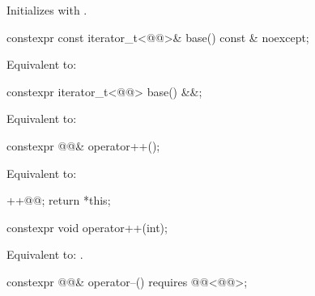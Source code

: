 \begin{itemdescr}
\pnum
\effects
Initializes  with .
\end{itemdescr}

%
\begin{itemdecl}
constexpr const iterator_t<@@>& base() const & noexcept;
\end{itemdecl}

\begin{itemdescr}
\pnum
\effects
Equivalent to: 
\end{itemdescr}

%
\begin{itemdecl}
constexpr iterator_t<@@> base() &&;
\end{itemdecl}

\begin{itemdescr}
\pnum
\effects
Equivalent to: 
\end{itemdescr}

%
\begin{itemdecl}
constexpr @@& operator++();
\end{itemdecl}

\begin{itemdescr}
\pnum
\effects
Equivalent to:
\begin{codeblock}
++@@;
return *this;
\end{codeblock}
\end{itemdescr}

%
\begin{itemdecl}
constexpr void operator++(int);
\end{itemdecl}

\begin{itemdescr}
\pnum
\effects
Equivalent to: .
\end{itemdescr}

%
\begin{itemdecl}
constexpr @@& operator--() requires @@<@@>;
\end{itemdecl}

